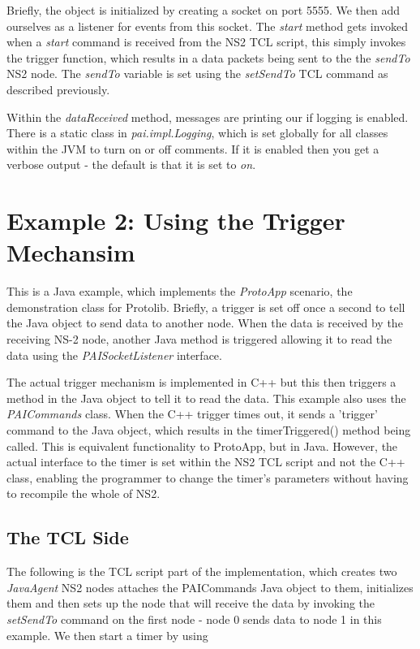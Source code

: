 Briefly, the object is initialized by creating a socket on port 5555. We then
add ourselves as a listener for events from this socket.   The \emph{start}
method gets invoked when a \emph{start} command is received from
the NS2 TCL script, this simply invokes the trigger function, which results
in a data packets being sent to the the \emph{sendTo} NS2 node.  The
\emph{sendTo} variable is set using the \emph{setSendTo} TCL
command as described previously.

Within the \emph{dataReceived} method, messages are printing our if
logging is enabled. There is a static class in \emph{pai.impl.Logging},
which is set globally for all classes within the JVM to turn on or off 
comments. If it is enabled then you get a verbose output - the default
is that it is set to \emph{on}.



\section{Example 2: Using the Trigger Mechansim}
\label{jnipai:trigger}

This is a Java example, which implements the \emph{ProtoApp}
scenario, the demonstration class for Protolib. Briefly, a trigger 
is set off once a second to tell the Java object to send data to
another node. When the data is received by
the receiving NS-2 node, another Java method is 
triggered allowing it to read the data using the  \emph{PAISocketListener}
interface.

The actual trigger mechanism is implemented in C++ but this then 
triggers a method in the Java object to tell it to read
the data. This example also uses the \emph{PAICommands}
class. When the C++ trigger times out, it sends a 'trigger' command
to the Java object, which results in the timerTriggered() method
being called.  This is equivalent functionality to ProtoApp, but in 
Java. However, the actual interface to the timer is set within the
NS2 TCL script and not the C++ class, enabling the programmer
to change the timer's parameters without having to recompile the
whole of NS2. 

\subsection{The TCL Side}
\label{jni:tclside}

The following is the TCL script part of the implementation, which creates two 
\emph{JavaAgent} NS2 nodes attaches the PAICommands Java object
to them, initializes them and then sets up the node that will receive the
data by invoking the \emph{setSendTo} command on the first node - node
0 sends data to node 1 in this example.  We then start a timer by using

